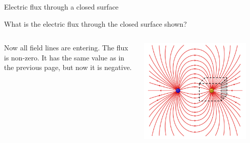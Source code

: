 \begin{frame}{Electric flux through a closed surface}

\begin{center}
 What is the electric flux through the closed surface shown?\\
\end{center}
\vspace{0.2cm}

\begin{columns}
  \begin{column}{0.38\textwidth}
   {\small
     Now all field lines are entering.
     The flux is non-zero. It has the same value as in the previous page, but now it is negative.
   }
   \begin{center}
   \end{center}
  \end{column}
  \begin{column}{0.62\textwidth}
    \includegraphics[width=0.90\textwidth]{./images/schematics/electric_dipole_field_lines_closed_surf_negq.png}\\
  \end{column}
\end{columns}
\end{frame}


%
%
%

